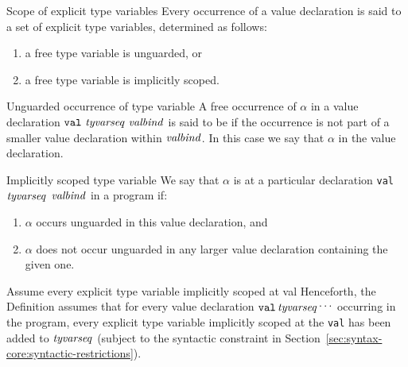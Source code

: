 \begin{definition}{Scope of explicit type variables}
Every occurrence of a value declaration is said to  a set
of explicit type variables, determined as follows:
\begin{enumerate}
\item a free type variable is unguarded, or
\item a free type variable is implicitly scoped.
\end{enumerate}
\end{definition}


\begin{definition}{Unguarded occurrence of type variable}
A free occurrence of $\alpha$ in a value declaration
$\mbox{{\tt val}\ \textit{tyvarseq\/}\ \textit{valbind\/}}$ is said to be  if the occurrence
is not part of a smaller value declaration within $\textit{valbind\/}$. In this
case we say that $\alpha$  in the value
declaration. 
\end{definition}

\begin{definition}{Implicitly scoped type variable}
We say that $\alpha$ is  at a particular
declaration {\texttt{val} $\textit{tyvarseq\/}$ $\textit{valbind\/}$} in a program if:
\begin{enumerate}
\item $\alpha$ occurs unguarded in this value declaration, and 
\item $\alpha$ does not occur unguarded in any larger value declaration
containing the given one.
\end{enumerate}
\end{definition}

\begin{clause}{Assume every explicit type variable implicitly scoped at val}
Henceforth, the Definition assumes that for every
value declaration $\hbox{\tt val}\,\textit{tyvarseq\/}\mathinner{{}^{\textstyle .\,.\,.}}$ occurring in the
program, every explicit type variable implicitly scoped at the {\tt val}
has been added to $\textit{tyvarseq\/}$ (subject to the syntactic constraint in Section~\ref{sec:syntax-core:syntactic-restrictions}).
\end{clause}

